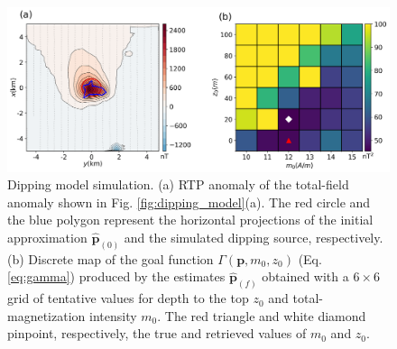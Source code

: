 \begin{figure}
    \centering
    \includegraphics[width=\linewidth]{figures/inclined_rtp.png}
    \caption{Dipping model simulation. (a) RTP anomaly of the total-field anomaly
    shown in Fig. \ref{fig:dipping_model}(a). 
	The red circle and the blue polygon represent the horizontal projections of
	the initial approximation $\hat{\mathbf{p}}_{(0)}$ and  the simulated dipping
	source, respectively.
	(b) Discrete map of the goal function $\Gamma(\mathbf{p}, m_0, z_0)$ (Eq.
	\ref{eq:gamma}) produced by the estimates $\hat{\mathbf{p}}_{(f)}$ obtained with
	a $6 \times 6$ grid of tentative values for depth to the top $z_0$ and
	total-magnetization intensity $m_0$.
	The red triangle  and white diamond pinpoint, respectively, the true and
	retrieved values of $m_0$  and $z_0$.     
}
    \label{fig:dipping_rtp}
\end{figure}


